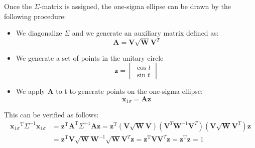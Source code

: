 \begin{appendices}
Once the $\Sigma$-matrix is assigned, the one-sigma ellipse can be drawn by the following procedure:
\begin{itemize}
\item We diagonalize $\Sigma$ and we generate an auxiliary matrix defined as:
\begin{equation}
\textbf{A} = \textbf{V} \sqrt{\textbf{W}} \textbf{V}^{T}
\end{equation}
\item We generate a set of points in the unitary circle
\begin{equation}
\textbf{z} = \left[
\begin{matrix}
\cos t\\
\sin t
\end{matrix}
\right]
\end{equation}
\item We apply $ \textbf{A} $ to t to generate points on the one-sigma ellipse:
\begin{equation}
\textbf{x}_{1\sigma} = \textbf{A} \textbf{z}
\end{equation}
\end{itemize}

This can be verified as follows:
\begin{align}
{\textbf{x}_{1\sigma}}^\mathrm{T}\Sigma^{-1}\textbf{x}_{1\sigma} 
&= \textbf{z}^\mathrm{T}\textbf{A}^\mathrm{T}\Sigma^{-1}\textbf{A}\textbf{z} = \textbf{z}^\mathrm{T}(\textbf{V} \sqrt{\textbf{W}} \textbf{V})(\textbf{V}^{T} \textbf{W}^{-1} \textbf{V}^{T})(\textbf{V}\sqrt{\textbf{W}} \textbf{V}^{T}) \textbf{z} \nonumber
\\&=\textbf{z}^\mathrm{T}\textbf{V} \sqrt{\textbf{W}}  \textbf{W}^{-1} \sqrt{\textbf{W}} \textbf{V}^{T}\textbf{z}
= \textbf{z}^\mathrm{T}\textbf{V}  \textbf{V}^{T}\textbf{z} 
= \textbf{z}^\mathrm{T}\textbf{z} = 1
\end{align}

\end{appendices}
